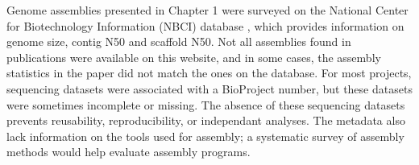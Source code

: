 Genome assemblies presented in Chapter 1 were surveyed on the National Center for Biotechnology Information (NBCI) database \cite{ncbi}, which provides information on genome size, contig N50 and scaffold N50. Not all assemblies found in publications were available on this website, and in some cases, the assembly statistics in the paper did not match the ones on the database. For most projects, sequencing datasets were associated with a BioProject number, but these datasets were sometimes incomplete or missing. The absence of these sequencing datasets prevents reusability, reproducibility, or independant analyses. The metadata also lack information on the tools used for assembly; a systematic survey of assembly methods would help evaluate assembly programs. \\
